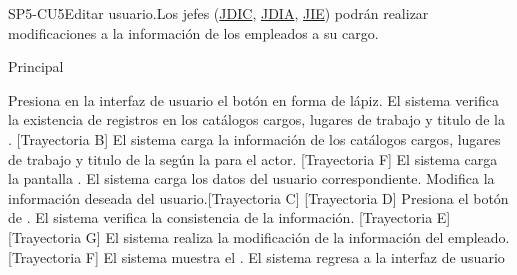 \begin{UseCase}{SP5-CU5}{Editar usuario.}{Los jefes (\hyperlink{JDIC}{JDIC}, \hyperlink{JDIA}{JDIA}, \hyperlink{JIE}{JIE}) podrán realizar modificaciones a la información de los empleados a su cargo.}
{\begin{itemize}
		\end{itemize}
	}
	
\end{UseCase}

\begin{UCtrayectoria}{Principal}
	
	\UCpaso[\UCactor] Presiona en la interfaz de usuario  el botón en forma de lápiz. 
	\UCpaso  El sistema verifica la existencia de registros en los catálogos cargos, lugares de trabajo y titulo de la  . [Trayectoria B] 
	\UCpaso El sistema carga la información de los catálogos cargos, lugares de trabajo y titulo de la  según la  para el actor. [Trayectoria F]
	\UCpaso El sistema carga la pantalla  . 
	\UCpaso El sistema carga los datos del usuario correspondiente. 
	\UCpaso[\UCactor] Modifica la información deseada del usuario.[Trayectoria C] [Trayectoria D]
	\UCpaso[\UCactor]  Presiona el botón de .
	\UCpaso El sistema verifica la consistencia de la información. [Trayectoria E] [Trayectoria G]
	\UCpaso El sistema realiza la modificación de la información del empleado. [Trayectoria F] 
	\UCpaso  El sistema muestra el .    
	\UCpaso El sistema regresa a la interfaz de usuario 
\end{UCtrayectoria}

